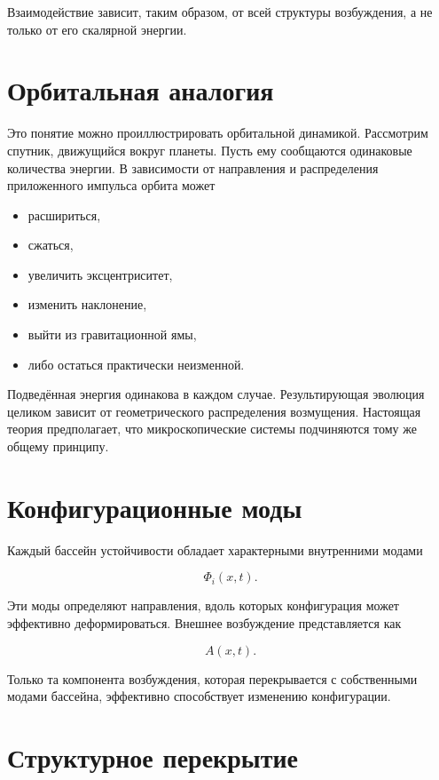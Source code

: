 Взаимодействие зависит, таким образом, от всей структуры возбуждения, а не только от его скалярной энергии.

\section{Орбитальная аналогия}

Это понятие можно проиллюстрировать орбитальной динамикой. Рассмотрим спутник, движущийся вокруг планеты. Пусть ему сообщаются одинаковые количества энергии. В зависимости от направления и распределения приложенного импульса орбита может

\begin{itemize}

\item расшириться,

\item сжаться,

\item увеличить эксцентриситет,

\item изменить наклонение,

\item выйти из гравитационной ямы,

\item либо остаться практически неизменной.

\end{itemize}

Подведённая энергия одинакова в каждом случае. Результирующая эволюция целиком зависит от геометрического распределения возмущения. Настоящая теория предполагает, что микроскопические системы подчиняются тому же общему принципу.

\section{Конфигурационные моды}

Каждый бассейн устойчивости обладает характерными внутренними модами

\[ \Phi_i(x,t). \]

Эти моды определяют направления, вдоль которых конфигурация может эффективно деформироваться. Внешнее возбуждение представляется как

\[ A(x,t). \]

Только та компонента возбуждения, которая перекрывается с собственными модами бассейна, эффективно способствует изменению конфигурации.

\section{Структурное перекрытие}

